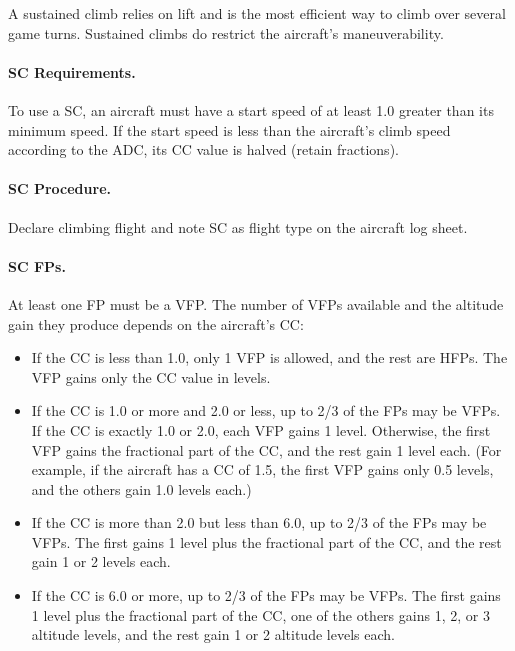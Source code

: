 {}{

A sustained climb relies on lift and is the most efficient way to climb over several game turns. Sustained climbs do restrict the aircraft’s maneuverability.

\paragraph{SC Requirements.} To use a SC, an aircraft must have a start speed of at least 1.0 greater than its minimum speed. If the start speed is less than the aircraft’s climb speed according to the ADC, its CC value is halved (retain fractions).

\paragraph{SC Procedure.} Declare climbing flight and note SC as flight type on the aircraft log sheet.

\paragraph{SC FPs.} At least one FP must be a VFP. The number of VFPs available and the altitude gain they produce depends on the aircraft’s CC:

\begin{itemize}
    \item If the CC is less than 1.0, only 1 VFP is allowed, and the rest are HFPs. The VFP gains only the CC value in levels.

    \item If the CC is 1.0 or more and 2.0 or less, up to 2/3 of the FPs may be VFPs.
If the CC is exactly 1.0 or 2.0, each VFP gains 1 level. Otherwise, the first VFP gains the fractional part of the CC, and the rest gain 1 level each. (For example, if the aircraft has a CC of 1.5, the first VFP gains only 0.5 levels, and the others gain 1.0 levels each.) 

    \item If the CC is more than 2.0 but less than 6.0, up to 2/3 of the FPs may be VFPs. The first gains 1 level plus the fractional part of the CC, and the rest gain 1 or 2 levels each. 

    \item If the CC is 6.0 or more,  up to 2/3 of the FPs may be VFPs. The first gains 1 level plus the fractional part of the CC, one of the others gains 1, 2, or 3 altitude levels, and the rest gain 1 or 2 altitude levels each. 


\end{itemize}}
